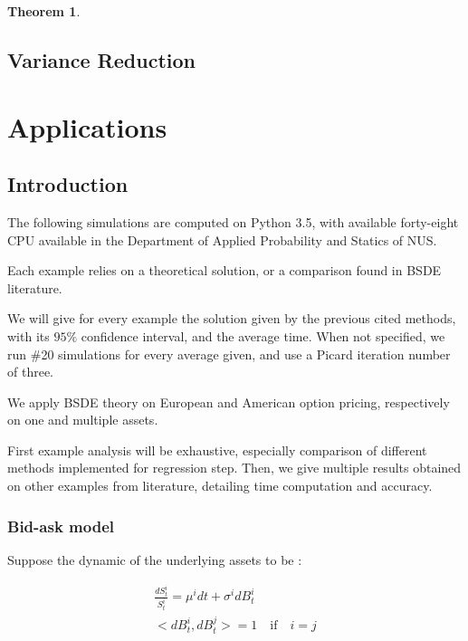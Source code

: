\documentclass[english,11pt,openany]{article}
\theoremstyle{definition}
\theoremstyle{plain}
\newtheorem{Th}{Theorem}[section]
\theoremstyle{definition}
\begin{document}
	\begin{Th}
		
	\end{Th}
	
	
	\subsection{Variance Reduction}	
	
	
	\newpage 
	
	\section{Applications}
	
	\subsection{Introduction}
	
	The following simulations are computed on Python 3.5, with available forty-eight CPU available in the Department of Applied Probability and Statics of NUS. 
	
	Each example relies on a theoretical solution, or a comparison found in BSDE literature. 
	
	We will give for every example the solution given by the previous cited methods, with its $95\%$ confidence interval, and the average time. 
	When not specified, we run \#20 simulations for every average given, and use a Picard iteration number of three. 
	
	We apply BSDE theory on European and American option pricing, respectively on one and multiple assets.
	
	First example analysis will be exhaustive, especially comparison of  different methods implemented for regression step.
	Then, we give multiple results obtained on other examples from literature, detailing time computation and accuracy.   
	
	
	\subsubsection{Bid-ask model}
	
	Suppose the dynamic of the underlying assets to be : 
	
	\begin{eqnarray}
	\frac{dS_t^i}{S_t^i}=\mu^i dt + \sigma^i dB_t^i\\
	<dB_t^i,dB_t^j> = 1 \quad \text{if} \quad i=j
	\end{eqnarray}
	
\end{document}
